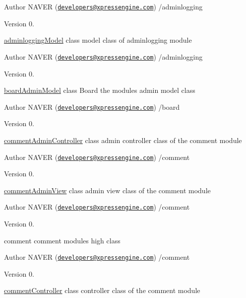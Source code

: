 \begin{DoxyAuthor}{Author}
N\+A\+V\+E\+R (\href{mailto:developers@xpressengine.com}{\tt developers@xpressengine.\+com}) /adminlogging 
\end{DoxyAuthor}
\begin{DoxyVersion}{Version}
0.
\end{DoxyVersion}
\hyperlink{classadminloggingModel}{adminlogging\+Model} class model class of adminlogging module

\begin{DoxyAuthor}{Author}
N\+A\+V\+E\+R (\href{mailto:developers@xpressengine.com}{\tt developers@xpressengine.\+com}) /adminlogging 
\end{DoxyAuthor}
\begin{DoxyVersion}{Version}
0.
\end{DoxyVersion}
\hyperlink{classboardAdminModel}{board\+Admin\+Model} class Board the module\textquotesingle{}s admin model class

\begin{DoxyAuthor}{Author}
N\+A\+V\+E\+R (\href{mailto:developers@xpressengine.com}{\tt developers@xpressengine.\+com}) /board 
\end{DoxyAuthor}
\begin{DoxyVersion}{Version}
0.
\end{DoxyVersion}
\hyperlink{classcommentAdminController}{comment\+Admin\+Controller} class admin controller class of the comment module

\begin{DoxyAuthor}{Author}
N\+A\+V\+E\+R (\href{mailto:developers@xpressengine.com}{\tt developers@xpressengine.\+com}) /comment 
\end{DoxyAuthor}
\begin{DoxyVersion}{Version}
0.
\end{DoxyVersion}
\hyperlink{classcommentAdminView}{comment\+Admin\+View} class admin view class of the comment module

\begin{DoxyAuthor}{Author}
N\+A\+V\+E\+R (\href{mailto:developers@xpressengine.com}{\tt developers@xpressengine.\+com}) /comment 
\end{DoxyAuthor}
\begin{DoxyVersion}{Version}
0.
\end{DoxyVersion}
comment comment module\textquotesingle{}s high class

\begin{DoxyAuthor}{Author}
N\+A\+V\+E\+R (\href{mailto:developers@xpressengine.com}{\tt developers@xpressengine.\+com}) /comment 
\end{DoxyAuthor}
\begin{DoxyVersion}{Version}
0.
\end{DoxyVersion}
\hyperlink{classcommentController}{comment\+Controller} class controller class of the comment module

